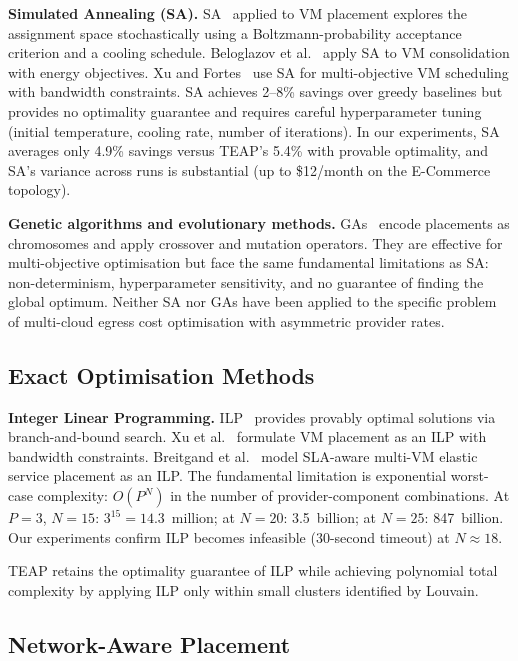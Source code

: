 \documentclass[sigconf,10pt]{acmart}
\begin{document}
\textbf{Simulated Annealing (SA).}
SA~\cite{kirkpatrick1983} applied to VM placement explores the assignment space
stochastically using a Boltzmann-probability acceptance criterion and a cooling
schedule.
Beloglazov et al.~\cite{beloglazov2012} apply SA to VM consolidation with energy
objectives.
Xu and Fortes~\cite{xu2010} use SA for multi-objective VM scheduling with bandwidth
constraints.
SA achieves 2--8\% savings over greedy baselines but provides no optimality guarantee
and requires careful hyperparameter tuning (initial temperature, cooling rate, number
of iterations).
In our experiments, SA averages only 4.9\% savings versus TEAP's 5.4\% with provable
optimality, and SA's variance across runs is substantial (up to \textpm\$12/month on
the E-Commerce topology).

\textbf{Genetic algorithms and evolutionary methods.}
GAs~\cite{beloglazov2012} encode placements as chromosomes and apply crossover and
mutation operators.
They are effective for multi-objective optimisation but face the same fundamental
limitations as SA: non-determinism, hyperparameter sensitivity, and no guarantee of
finding the global optimum.
Neither SA nor GAs have been applied to the specific problem of multi-cloud
egress cost optimisation with asymmetric provider rates.

\subsection{Exact Optimisation Methods}

\textbf{Integer Linear Programming.}
ILP~\cite{breitgand2012} provides provably optimal solutions via branch-and-bound
search.
Xu et al.~\cite{xu2010} formulate VM placement as an ILP with bandwidth constraints.
Breitgand et al.~\cite{breitgand2012} model SLA-aware multi-VM elastic service
placement as an ILP.
The fundamental limitation is exponential worst-case complexity: $O(P^N)$ in the
number of provider-component combinations.
At $P=3$, $N=15$: $3^{15} = 14.3$~million; at $N=20$: 3.5~billion; at $N=25$:
847~billion.
Our experiments confirm ILP becomes infeasible (30-second timeout) at $N \approx 18$.

TEAP retains the optimality guarantee of ILP while achieving polynomial total
complexity by applying ILP only within small clusters identified by Louvain.

\subsection{Network-Aware Placement}
\end{document}
